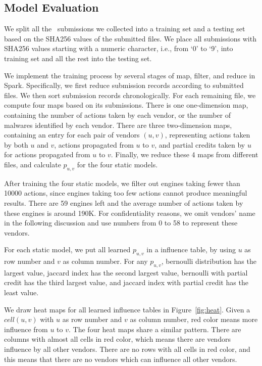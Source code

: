 \subsection{Model Evaluation}
\label{sec:predict}

We split all the \pe\ submissions we collected into a training set and a testing set based on the SHA256 values of the submitted files. 
We place all submissions with SHA256 values starting with a numeric character, 
i.e., from ‘0’ to ‘9’, into training set
and all the rest into the testing set.

We implement the training process by several stages of map, filter, and reduce in Spark. 
Specifically, we first reduce submission records according to submitted files. 
We then sort submission records chronologically.
For each remaining file, we compute four maps based on its submissions.
There is one one-dimension map, 
containing the number of actions taken by each vendor, 
or the number of malwares identified by each vendor. 
There are three two-dimension maps, 
containing an entry for each pair of vendors $(u,v)$, 
representing actions taken by both $u$ and $v$, actions propagated from $u$ to $v$, 
and partial credits taken by $u$ for actions propagated from $u$ to $v$. 
Finally, we reduce these 4 maps from different files, 
and calculate $p_{u,v}$ for the four static models. 

After training the four static models, 
we filter out engines taking fewer than 10000 actions,
since engines taking too few actions cannot produce meaningful results.
There are 59 engines left
and the average number of actions taken by these engines is around 190K. %
For confidentiality reasons, we omit vendors’ name in the following discussion
and use numbers from 0 to 58 to represent these vendors.

For each static model, 
we put all learned $p_{u,v}$ in a influence table, 
by using $u$ as row number and $v$ as column number.
For any $p_{u,v}$, bernoulli distribution has the largest value, 
jaccard index has the second largest value, 
bernoulli with partial credit has the third largest value,
and jaccard index with partial credit has the least value. 



We draw heat maps for all learned influence tables in Figure~\ref{fig:heat}. 
Given a $cell(u, v)$ with $u$ as row number and $v$ as column number, 
red color means more influence from $u$ to $v$. 
The four heat maps share a similar pattern.
There are columns with almost all cells in red color, 
which means there are vendors influence by all other vendors. 
There are no rows with all cells in red color, 
and this means that there are no vendors which can influence all other vendors. 

